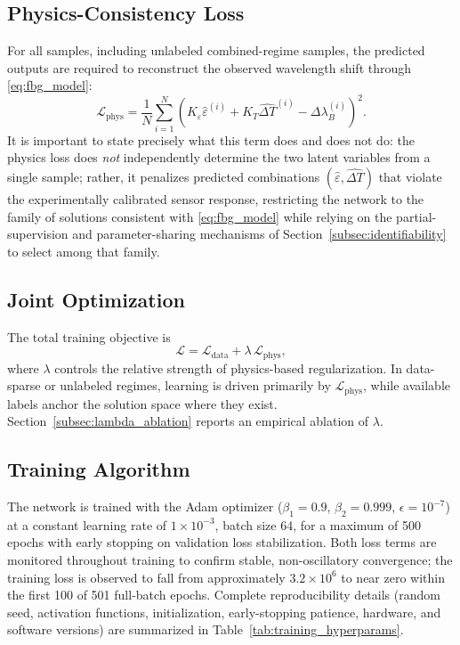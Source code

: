 \documentclass[journal,twoside,web]{ieeecolor}
\begin{document}
\subsection{Physics-Consistency Loss}

For all samples, including unlabeled combined-regime samples, the predicted
outputs are required to reconstruct the observed wavelength shift through
\eqref{eq:fbg_model}:
\begin{equation}
\mathcal{L}_{\text{phys}} =
\frac{1}{N}\sum_{i=1}^{N}
\left(K_{\varepsilon}\hat{\varepsilon}^{(i)} + K_T\widehat{\Delta T}^{(i)} - \Delta \lambda_B^{(i)}\right)^2.
\label{eq:physics_loss}
\end{equation}
It is important to state precisely what this term does and does not do: the
physics loss does \emph{not} independently determine the two latent
variables from a single sample; rather, it penalizes predicted combinations
$(\hat\varepsilon,\widehat{\Delta T})$ that violate the experimentally
calibrated sensor response, restricting the network to the family of
solutions consistent with \eqref{eq:fbg_model} while relying on the
partial-supervision and parameter-sharing mechanisms of
Section~\ref{subsec:identifiability} to select among that family.

\subsection{Joint Optimization}

The total training objective is
\begin{equation}
\mathcal{L} = \mathcal{L}_{\text{data}} + \lambda\,\mathcal{L}_{\text{phys}},
\label{eq:total_loss}
\end{equation}
where $\lambda$ controls the relative strength of physics-based
regularization. In data-sparse or unlabeled regimes, learning is driven
primarily by $\mathcal{L}_{\text{phys}}$, while available labels anchor the
solution space where they exist. Section~\ref{subsec:lambda_ablation}
reports an empirical ablation of $\lambda$.

\subsection{Training Algorithm}

The network is trained with the Adam optimizer ($\beta_1=0.9$,
$\beta_2=0.999$, $\epsilon=10^{-7}$) at a constant learning rate of
$1\times10^{-3}$, batch size 64, for a maximum of 500 epochs with early
stopping on validation loss stabilization. Both loss terms are monitored
throughout training to confirm stable, non-oscillatory convergence; the
training loss is observed to fall from approximately $3.2\times10^{6}$ to
near zero within the first 100 of 501 full-batch epochs. Complete
reproducibility details (random seed, activation functions, initialization,
early-stopping patience, hardware, and software versions) are summarized in
Table~\ref{tab:training_hyperparams}.
\end{document}
